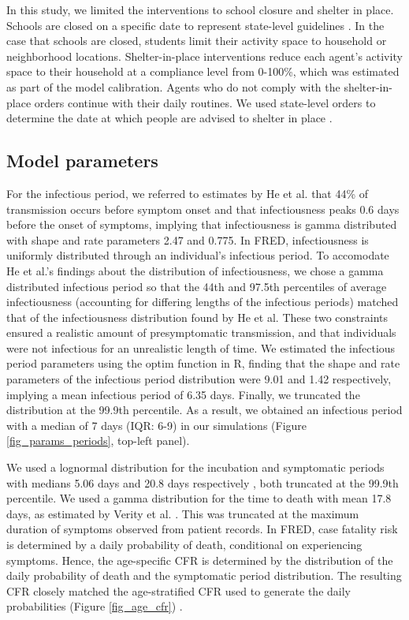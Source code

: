 \documentclass[11pt]{article}
\begin{document}
In this study, we limited the interventions to school closure and shelter in place. Schools are closed on a specific date to represent state-level guidelines \cite{ihme_covid19_forecasting}. In the case that schools are closed, students limit their activity space to household or neighborhood locations. Shelter-in-place interventions reduce each agent’s activity space to their household at a compliance level from 0-100\%, which was estimated as part of the model calibration. Agents who do not comply with the shelter-in-place orders continue with their daily routines. We used state-level orders to determine the date at which people are advised to shelter in place \cite{ihme_covid19_forecasting}. 

\subsection{Model parameters}
For the infectious period, we referred to estimates by He et al. that 44\% of transmission occurs before symptom onset and that infectiousness peaks 0.6 days before the onset of symptoms, implying that infectiousness is gamma distributed with shape and rate parameters 2.47 and 0.775\cite{He2020_Nature}. In FRED, infectiousness is uniformly distributed through an individual’s infectious period. To accomodate He et al.’s findings about the distribution of infectiousness, we chose a gamma distributed infectious period so that the 44th and 97.5th percentiles of average infectiousness (accounting for differing lengths of the infectious periods) matched that of the infectiousness distribution found by He et al. These two constraints ensured a realistic amount of presymptomatic transmission, and that individuals were not infectious for an unrealistic length of time. We estimated the infectious period parameters using the optim function in R, finding that the shape and rate parameters of the infectious period distribution were 9.01 and 1.42 respectively, implying a mean infectious period of 6.35 days. Finally, we truncated the distribution at the 99.9th percentile. As a result, we obtained an infectious period with a median of 7 days (IQR: 6-9) in our simulations (Figure \ref{fig_params_periods}, top-left panel). 

We used a lognormal distribution for the incubation and symptomatic periods with medians 5.06 days and 20.8 days respectively \cite{Lauer2020_Annals,Bi2020_LancetID}, both truncated at the 99.9th percentile. We used a gamma distribution for the time to death with mean 17.8 days, as estimated by Verity et al. \cite{Verity2020_LancetID}. This was truncated at the maximum duration of symptoms observed from patient records. In FRED, case fatality risk is determined by a daily probability of death, conditional on experiencing symptoms. Hence, the age-specific CFR is determined by the distribution of the daily probability of death and the symptomatic period distribution. The resulting CFR closely matched the age-stratified CFR used to generate the daily probabilities (Figure \ref{fig_age_cfr}) \cite{Wu2020_Nature}.
\end{document}
